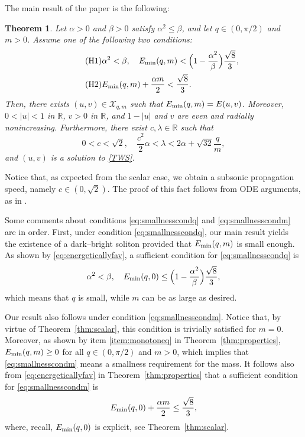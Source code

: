 \documentclass[11pt]{article}
\newcommand{\R}{\mathbb{R}}
\newcommand{\boX}{\mathcal{X}}
\newcommand{\Emin}{E_\textup{min}}
\theoremstyle{plain}
\newtheorem{theorem}{Theorem}[section]
\theoremstyle{definition}
\theoremstyle{remark}
\numberwithin{equation}{section}
\begin{document}
{The main result of the paper is the following:

\begin{theorem}\label{thm:mainresult}
    Let $\alpha>0$ and $\beta > 0$ satisfy $\alpha^2\leq\beta$, and let $q\in (0,\pi/2)$ and $m>0$. Assume one of the following two conditions:
    \begin{align} \label{eq:smallnesscondq}\tag{H1}
        &\alpha^2<\beta,\quad \Emin(q,m)< \Big(1-\frac{\alpha^2}{\beta}\Big)\frac{\sqrt{8}}{3},
        \\
     \label{eq:smallnesscondm}\tag{H2}
         &\Emin(q,m)+\frac{\alpha m}{2}<\frac{\sqrt{8}}{3}.
    \end{align}
    Then, there exists $(u,v)\in \boX_{q,m}$ such that $\Emin(q,m)=E(u,v)$. Moreover, $0<|u|<1$ in $\R$, $v>0$ in $\R$, and $1-|u|$ and $v$ are even and radially nonincreasing. Furthermore, there exist $c,\lambda\in\R$ such that
    \begin{equation}\label{eq:mulambdaestimates}
    0<c<\sqrt{2},\quad  \frac{c^2}{2}\alpha<\lambda< 2\alpha+\sqrt{32}\frac{q}{m},
    \end{equation}
    and $(u,v)$ is a solution to \eqref{TWS}. 
\end{theorem}

Notice that, as expected from the scalar case, we obtain a subsonic propagation speed, namely $c\in (0,\sqrt{2})$. The proof of this fact follows from ODE arguments, as in \cite{Maris2006}.

{
Some comments about conditions \eqref{eq:smallnesscondq} and \eqref{eq:smallnesscondm} are in order. First, under condition \eqref{eq:smallnesscondq}, our main result yields the existence of a dark--bright soliton provided that $\Emin(q,m)$ is small enough. As shown by \eqref{eq:energeticallyfav}, a sufficient condition for \eqref{eq:smallnesscondq} is 
\[\alpha^2<\beta,\quad \Emin(q,0)\leq  \Big(1-\frac{\alpha^2}{\beta}\Big)\frac{\sqrt{8}}{3},\]
which means that $q$ is small, while $m$ can be as large as desired.

Our result also follows under condition \eqref{eq:smallnesscondm}. Notice that, by virtue of Theorem~\ref{thm:scalar}, this condition is trivially satisfied for $m=0$. Moreover, as shown by item \ref{item:monotoneq} in
Theorem~\ref{thm:properties}, $\Emin(q,m)\geq 0$ for all $q\in (0,\pi/2)$ and $m>0$, which implies that \eqref{eq:smallnesscondm} means a smallness requirement for the mass. It follows also from \eqref{eq:energeticallyfav} in Theorem~\ref{thm:properties} that a sufficient condition for \eqref{eq:smallnesscondm} is
\[\Emin(q,0)+\frac{\alpha m}{2}\leq\frac{\sqrt{8}}{3},\]
where, recall, $\Emin(q,0)$ is explicit, see Theorem~\ref{thm:scalar}. 

}}
\end{document}
